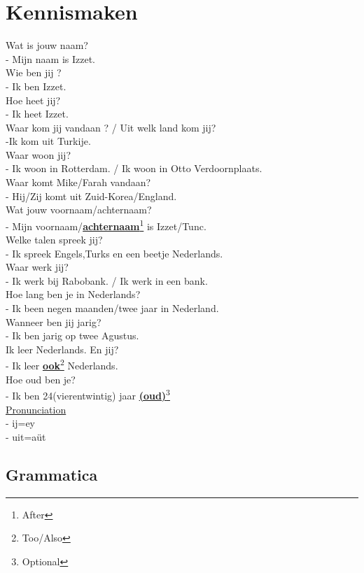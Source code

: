 \documentclass[a4paper,14pt]{extarticle}
\newcommand{\optional}[1]{\underline{\textbf{(#1)}}\footnote{Optional}}
\newcommand{\note}[2]{\underline{\textbf{#1}}\footnote{#2}}
\begin{document}
\section{Kennismaken}
\begin{paracol}{2}
Wat is jouw naam? \\
- Mijn naam is Izzet. \\
Wie ben jij ? \\
- Ik ben Izzet. \\
Hoe heet jij? \\
- Ik heet Izzet. \\
Waar kom jij vandaan ? / Uit welk land kom jij? \\
-Ik kom uit Turkije. \\
Waar woon jij? \\
- Ik woon in Rotterdam. / Ik woon in Otto Verdoornplaats. \\
Waar komt Mike/Farah vandaan? \\
- Hij/Zij komt uit Zuid-Korea/England. \\
Wat jouw voornaam/achternaam? \\
- Mijn voornaam/\note{achternaam}{After} is Izzet/Tunc. \\
Welke talen spreek jij? \\
- Ik spreek Engels,Turks en een beetje Nederlands. \\
Waar werk jij? \\
- Ik werk bij Rabobank. / Ik werk in een bank. \\
Hoe lang ben je in Nederlands? \\
- Ik been negen maanden/twee jaar in Nederland. \\
Wanneer ben jij jarig? \\
- Ik ben jarig op twee Agustus. \\
Ik leer Nederlands. En jij? \\
- Ik leer \note{ook}{Too/Also} Nederlands. \\
Hoe oud ben je? \\
- Ik ben 24(vierentwintig) jaar \optional{oud} \\
\switchcolumn
\underline{Pronunciation} \\
- ij=ey \\
- uit=aüt \\
\end{paracol}
\newpage
\subsection{Grammatica}
\end{document}
